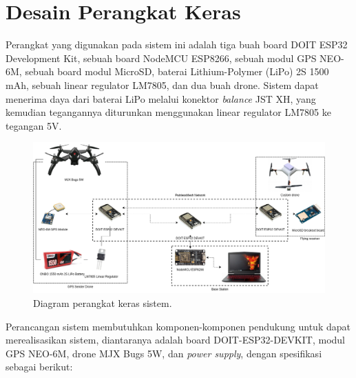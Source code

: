 \section{Desain Perangkat Keras}
Perangkat yang digunakan pada sistem ini adalah tiga buah board DOIT ESP32 Development Kit, sebuah board NodeMCU ESP8266, sebuah modul GPS NEO-6M, sebuah board modul MicroSD, baterai Lithium-Polymer (LiPo) 2S 1500 mAh, sebuah linear regulator LM7805, dan dua buah drone. Sistem dapat menerima daya dari baterai LiPo melalui konektor \textit{balance} JST XH, yang kemudian tegangannya diturunkan menggunakan linear regulator LM7805 ke tegangan 5V.

\begin{figure}[H]
	\centering
	\includegraphics[scale=0.35]{./assets/DiagramHWNew}
	\caption{Diagram perangkat keras sistem.}
\end{figure}
Perancangan sistem membutuhkan komponen-komponen pendukung untuk dapat merealisasikan sistem, diantaranya adalah board DOIT-ESP32-DEVKIT, modul GPS NEO-6M, drone MJX Bugs 5W, dan \textit{power supply}, dengan spesifikasi sebagai berikut:
